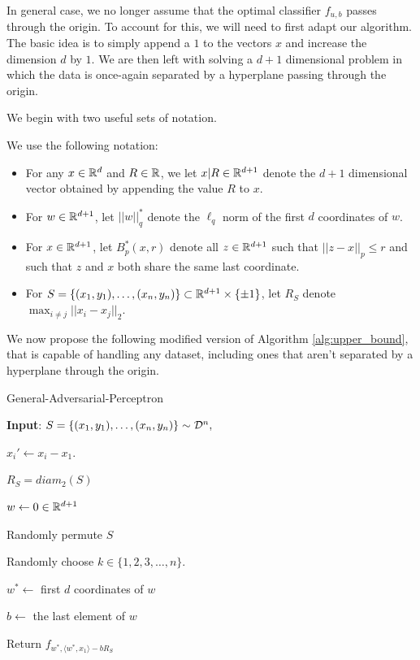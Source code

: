 In general case, we no longer assume that the optimal classifier $f_{u, b}$ passes through the origin. To account for this, we will need to first adapt our algorithm. The basic idea is to simply append a $1$ to the vectors $x$ and increase the dimension $d$ by $1$. We are then left with solving a $d+1$ dimensional problem in which the data is once-again separated by a hyperplane passing through the origin. 

We begin with two useful sets of notation.


\begin{defn}
We use the following notation:
\begin{itemize}
	\item For any $x \in \mathbb R^d$ and $R \in \mathbb R$, we let $x|R \in \mathbb R^{d+1}$ denote the $d+1$ dimensional vector obtained by appending the value $R$ to $x$. 
	\item For $w \in \mathbb R^{d+1}$, let $||w||_q^*$ denote the $\ell_q$ norm of the first $d$ coordinates of $w$.
	\item For $x \in \mathbb R^{d+1}$, let $B_p^*(x, r)$ denote all $z \in \mathbb R^{d+1}$ such that $||z - x||_p \leq r$ and such that $z$ and $x$ both share the same last coordinate.
	\item For $S = \{(x_1, y_1), \dots, (x_n, y_n)\} \subset \mathbb R^{d+1} \times \{\pm 1\}$, let $R_S$ denote $\max_{i \neq j} ||x_i - x_j||_2$. 
\end{itemize}


 
\end{defn}

We now propose the following modified version of Algorithm \ref{alg:upper_bound}, that is capable of handling any dataset, including ones that aren't separated by a hyperplane through the origin.

\begin{algorithm}[H]
    \caption{General-Adversarial-Perceptron}
    \label{alg:gen_upper_bound}
    
    \textbf{Input}:  $S = \{(x_1, y_1), \dots, (x_n, y_n)\} \sim {\mathcal D}^n,$
    
    $x_i' \leftarrow x_i - x_1$. 
    
    $R_S = diam_2(S)$
    
    $w \leftarrow 0 \in \mathbb R^{d+1}$
    
    Randomly permute $S$
    
    Randomly choose $k \in \{1, 2, 3, \dots, n\}$.
     
     
    $w^* \leftarrow$ first $d$ coordinates of $w$
    
    $b \leftarrow$ the last element of $w$
    
    Return $f_{w^*, \langle w^*, x_1 \rangle -bR_S}$

\end{algorithm}

